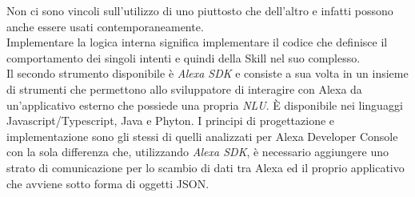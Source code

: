 		Non ci sono vincoli sull'utilizzo di uno piuttosto che dell'altro e infatti possono anche essere usati contemporaneamente. \\
		Implementare la logica interna significa implementare il codice che definisce il comportamento dei singoli intenti e quindi della Skill nel suo complesso. \\
		Il secondo strumento disponibile è \textit{Alexa SDK} e consiste a sua volta in un insieme di strumenti che permettono allo sviluppatore di interagire con Alexa da un'applicativo esterno che possiede una propria \textit{NLU}. È disponibile nei linguaggi Javascript/Typescript, Java e Phyton. I principi di progettazione e implementazione sono gli stessi di quelli analizzati per Alexa Developer Console con la sola differenza che, utilizzando \textit{Alexa SDK}, è necessario aggiungere uno strato di comunicazione per lo scambio di dati tra Alexa ed il proprio applicativo che avviene sotto forma di oggetti JSON.
